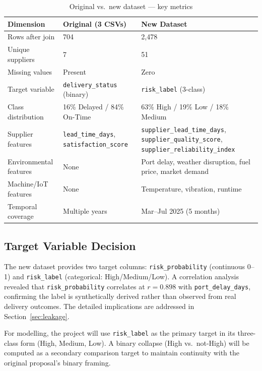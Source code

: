 \documentclass[11pt,a4paper]{article}
\begin{document}
\begin{table}[htbp]
\centering
\caption{Original vs.\ new dataset --- key metrics}
\label{tab:dataset-compare}
\renewcommand{\arraystretch}{1.25}
\begin{tabularx}{\textwidth}{L{4.2cm} X X}
\toprule
\textbf{Dimension} & \textbf{Original (3 CSVs)} & \textbf{New Dataset} \\
\midrule
{}
Rows after join & 704 & 2,478 \\
Unique suppliers & 7 & 51 \\
Missing values & Present & Zero \\
Target variable & \texttt{delivery\_status} (binary) & \texttt{risk\_label} (3-class) \\
Class distribution & 16\% Delayed / 84\% On-Time & 63\% High / 19\% Low / 18\% Medium \\
Supplier features & \texttt{lead\_time\_days}, \texttt{satisfaction\_score} & \texttt{supplier\_lead\_time\_days}, \texttt{supplier\_quality\_score}, \texttt{supplier\_reliability\_index} \\
Environmental features & None & Port delay, weather disruption, fuel price, market demand \\
Machine/IoT features & None & Temperature, vibration, runtime \\
Temporal coverage & Multiple years & Mar--Jul 2025 (5 months) \\
\bottomrule
\end{tabularx}
\end{table}

\subsection{Target Variable Decision}

The new dataset provides two target columns: \texttt{risk\_probability} (continuous
0--1) and \texttt{risk\_label} (categorical: High/Medium/Low). A correlation analysis
revealed that \texttt{risk\_probability} correlates at $r = 0.898$ with
\texttt{port\_delay\_days}, confirming the label is synthetically derived rather than
observed from real delivery outcomes. The detailed implications are addressed in
Section~\ref{sec:leakage}.

For modelling, the project will use \texttt{risk\_label} as the primary target in its
three-class form (High, Medium, Low). A binary collapse (High vs.\ not-High) will be
computed as a secondary comparison target to maintain continuity with the original
proposal's binary framing.
\end{document}

